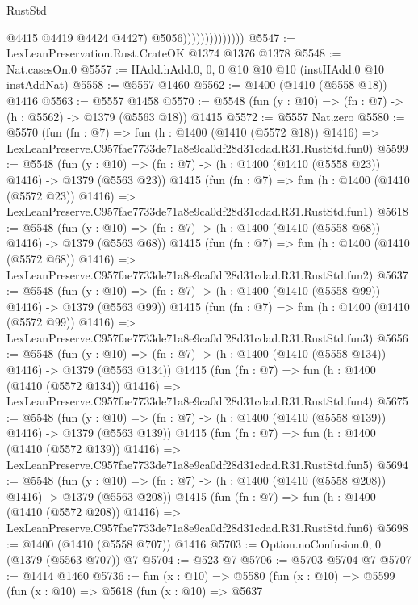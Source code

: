 \begin{lexlean}{RustStd}
\begin{coremodule}
                                  @4415
                                  @4419
                                  @4424
                                  @4427)
                                @5056))))))))))))))
@5547 := LexLeanPreservation.Rust.CrateOK @1374 @1376 @1378
@5548 := Nat.casesOn.{0}
@5557 := HAdd.hAdd.{0, 0, 0} @10 @10 @10 (instHAdd.{0} @10 instAddNat)
@5558 := @5557 @1460
@5562 := @1400 (@1410 (@5558 @18)) @1416
@5563 := @5557 @1458
@5570 := @5548 (fun (y : @10) => (fn : @7) -> (h : @5562) -> @1379 (@5563 @18)) @1415
@5572 := @5557 Nat.zero
@5580 := @5570
    (fun (fn : @7) =>
    fun (h : @1400 (@1410 (@5572 @18)) @1416) =>
    LexLeanPreserve.C957fae7733de71a8e9ca0df28d31cdad.R31.RustStd.fun0)
@5599 := @5548
    (fun (y : @10) => (fn : @7) -> (h : @1400 (@1410 (@5558 @23)) @1416) -> @1379 (@5563 @23))
    @1415
    (fun (fn : @7) =>
    fun (h : @1400 (@1410 (@5572 @23)) @1416) =>
    LexLeanPreserve.C957fae7733de71a8e9ca0df28d31cdad.R31.RustStd.fun1)
@5618 := @5548
    (fun (y : @10) => (fn : @7) -> (h : @1400 (@1410 (@5558 @68)) @1416) -> @1379 (@5563 @68))
    @1415
    (fun (fn : @7) =>
    fun (h : @1400 (@1410 (@5572 @68)) @1416) =>
    LexLeanPreserve.C957fae7733de71a8e9ca0df28d31cdad.R31.RustStd.fun2)
@5637 := @5548
    (fun (y : @10) => (fn : @7) -> (h : @1400 (@1410 (@5558 @99)) @1416) -> @1379 (@5563 @99))
    @1415
    (fun (fn : @7) =>
    fun (h : @1400 (@1410 (@5572 @99)) @1416) =>
    LexLeanPreserve.C957fae7733de71a8e9ca0df28d31cdad.R31.RustStd.fun3)
@5656 := @5548
    (fun (y : @10) => (fn : @7) -> (h : @1400 (@1410 (@5558 @134)) @1416) -> @1379 (@5563 @134))
    @1415
    (fun (fn : @7) =>
    fun (h : @1400 (@1410 (@5572 @134)) @1416) =>
    LexLeanPreserve.C957fae7733de71a8e9ca0df28d31cdad.R31.RustStd.fun4)
@5675 := @5548
    (fun (y : @10) => (fn : @7) -> (h : @1400 (@1410 (@5558 @139)) @1416) -> @1379 (@5563 @139))
    @1415
    (fun (fn : @7) =>
    fun (h : @1400 (@1410 (@5572 @139)) @1416) =>
    LexLeanPreserve.C957fae7733de71a8e9ca0df28d31cdad.R31.RustStd.fun5)
@5694 := @5548
    (fun (y : @10) => (fn : @7) -> (h : @1400 (@1410 (@5558 @208)) @1416) -> @1379 (@5563 @208))
    @1415
    (fun (fn : @7) =>
    fun (h : @1400 (@1410 (@5572 @208)) @1416) =>
    LexLeanPreserve.C957fae7733de71a8e9ca0df28d31cdad.R31.RustStd.fun6)
@5698 := @1400 (@1410 (@5558 @707)) @1416
@5703 := Option.noConfusion.{0, 0} (@1379 (@5563 @707)) @7
@5704 := @523 @7
@5706 := @5703 @5704 @7
@5707 := @1414 @1460
@5736 := fun (x : @10) =>
  @5580
    (fun (x : @10) =>
    @5599
      (fun (x : @10) =>
      @5618
        (fun (x : @10) =>
        @5637

\end{coremodule}
\end{lexlean}
